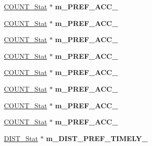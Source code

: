 \begin{DoxyCompactItemize}
\item 
\hypertarget{classall__stats__c_a9db1b8a45ef4e9f739f2843de64d971e}{
\hyperlink{classCOUNT__Stat}{COUNT\_\-Stat} $\ast$ {\bfseries m\_\-PREF\_\-ACC\_}}
\label{classall__stats__c_a9db1b8a45ef4e9f739f2843de64d971e}

\item 
\hypertarget{classall__stats__c_a0b5ec435488da8b74e72295c4844197a}{
\hyperlink{classCOUNT__Stat}{COUNT\_\-Stat} $\ast$ {\bfseries m\_\-PREF\_\-ACC\_}}
\label{classall__stats__c_a0b5ec435488da8b74e72295c4844197a}

\item 
\hypertarget{classall__stats__c_a72bff8e7dc3f8d8457f92e61e3bc2d9f}{
\hyperlink{classCOUNT__Stat}{COUNT\_\-Stat} $\ast$ {\bfseries m\_\-PREF\_\-ACC\_}}
\label{classall__stats__c_a72bff8e7dc3f8d8457f92e61e3bc2d9f}

\item 
\hypertarget{classall__stats__c_add95c473fffed31b5365f995782e9b8e}{
\hyperlink{classCOUNT__Stat}{COUNT\_\-Stat} $\ast$ {\bfseries m\_\-PREF\_\-ACC\_}}
\label{classall__stats__c_add95c473fffed31b5365f995782e9b8e}

\item 
\hypertarget{classall__stats__c_ac047403322c6c3222133a03eef507aa3}{
\hyperlink{classCOUNT__Stat}{COUNT\_\-Stat} $\ast$ {\bfseries m\_\-PREF\_\-ACC\_}}
\label{classall__stats__c_ac047403322c6c3222133a03eef507aa3}

\item 
\hypertarget{classall__stats__c_aedb48c31366d1138746d9bf0b8722294}{
\hyperlink{classCOUNT__Stat}{COUNT\_\-Stat} $\ast$ {\bfseries m\_\-PREF\_\-ACC\_}}
\label{classall__stats__c_aedb48c31366d1138746d9bf0b8722294}

\item 
\hypertarget{classall__stats__c_a6c5d2f6cd7ef229133d3efcedba83e18}{
\hyperlink{classCOUNT__Stat}{COUNT\_\-Stat} $\ast$ {\bfseries m\_\-PREF\_\-ACC\_}}
\label{classall__stats__c_a6c5d2f6cd7ef229133d3efcedba83e18}

\item 
\hypertarget{classall__stats__c_abeabd1326cc2a852ea662a17fd3cd317}{
\hyperlink{classCOUNT__Stat}{COUNT\_\-Stat} $\ast$ {\bfseries m\_\-PREF\_\-ACC\_}}
\label{classall__stats__c_abeabd1326cc2a852ea662a17fd3cd317}

\item 
\hypertarget{classall__stats__c_a8d981d3d942ec904f3d1dfa05a8451d0}{
\hyperlink{classDIST__Stat}{DIST\_\-Stat} $\ast$ {\bfseries m\_\-DIST\_\-PREF\_\-TIMELY\_}}
\label{classall__stats__c_a8d981d3d942ec904f3d1dfa05a8451d0}


\end{DoxyCompactItemize}
